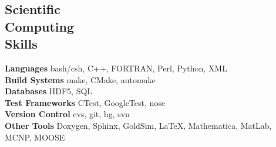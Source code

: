 \documentclass[margin,line]{resume}
\begin{document}
\begin{resume}
    \section{\mysidestyle Scientific\\Computing\\Skills}
                \textbf{Languages} \hfill bash/csh, C++, FORTRAN, Perl, Python, XML\vspace{.5mm}\\%
                \textbf{Build Systems} \hfill make, CMake, automake\vspace{.5mm}\\%
                \textbf{Databases} \hfill HDF5, SQL\vspace{.5mm}\\%
                \textbf{Test Frameworks} \hfill CTest, GoogleTest, nose\vspace{.5mm}\\%
                \textbf{Version Control} \hfill cvs, git, hg, svn\vspace{.5mm}\\%
                \textbf{Other Tools} \hfill Doxygen, Sphinx, GoldSim, \LaTeX, Mathematica, MatLab, MCNP, MOOSE\vspace{.5mm}%



\end{resume}
\end{document}

